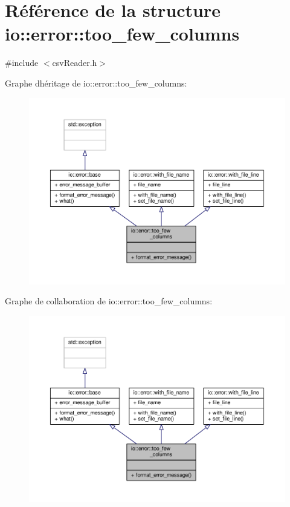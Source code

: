 \hypertarget{structio_1_1error_1_1too__few__columns}{}\section{Référence de la structure io\+:\+:error\+:\+:too\+\_\+few\+\_\+columns}
\label{structio_1_1error_1_1too__few__columns}


{\ttfamily \#include $<$csv\+Reader.\+h$>$}



Graphe d\textquotesingle{}héritage de io\+:\+:error\+:\+:too\+\_\+few\+\_\+columns\+:\nopagebreak
\begin{figure}[H]
\begin{center}
\leavevmode
\includegraphics[width=350pt]{structio_1_1error_1_1too__few__columns__inherit__graph}
\end{center}
\end{figure}


Graphe de collaboration de io\+:\+:error\+:\+:too\+\_\+few\+\_\+columns\+:\nopagebreak
\begin{figure}[H]
\begin{center}
\leavevmode
\includegraphics[width=350pt]{structio_1_1error_1_1too__few__columns__coll__graph}
\end{center}
\end{figure}
